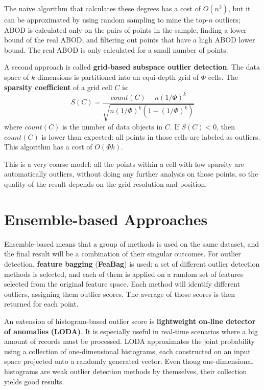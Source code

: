 The naive algorithm that calculates these degrees has a cost of $O(n^3)$, but it can be approximated by using random sampling to mine the top-$n$ outliers; ABOD is calculated only on the pairs of points in the sample, finding a lower bound of the real ABOD, and filtering out points that have a high ABOD lower bound. The real ABOD is only calculated for a small number of points.

A second approach is called \textbf{grid-based subspace outlier detection}. The data space of $k$ dimensions is partitioned into an equi-depth grid of $\Phi$ cells. The \textbf{sparsity coefficient} of a grid cell $C$ is:
\begin{equation*}
    S(C) = \dfrac{\textit{count}(C) - n (1/ \Phi)^k}{\sqrt{n(1/\Phi)^k (1-(1/\Phi)^k)}}
\end{equation*}
where $\textit{count}(C)$ is the number of data objects in $C$. If $S(C) < 0$, then $\textit{count}(C)$ is lower than expected: all points in those cells are labeled as outliers. This algorithm has a cost of $O(\Phi k)$.

This is a very coarse model: all the points within a cell with low sparsity are automatically outliers, without doing any further analysis on those points, so the quality of the result depends on the grid resolution and position. 

\section{Ensemble-based Approaches}

Ensemble-based means that a group of methods is used on the same dataset, and the final result will be a combination of their singular outcomes. For outlier detection, \textbf{feature bagging} (\textbf{FeaBag}) is used: a set of different outlier detection methods is selected, and each of them is applied on a random set of features selected from the original feature space. Each method will identify different outliers, assigning them outlier scores. The average of those scores is then returned for each point.

An extension of histogram-based outlier score is \textbf{lightweight on-line detector of anomalies} \textbf{(LODA)}. It is especially useful in real-time scenarios where a big amount of records must be processed. LODA approximates the joint probability using a collection of one-dimensional histograms, each constructed on an input space projected onto a randomly generated vector. Even thoug one-dimensional histograms are weak outlier detection methods by themselves, their collection yields good results.

